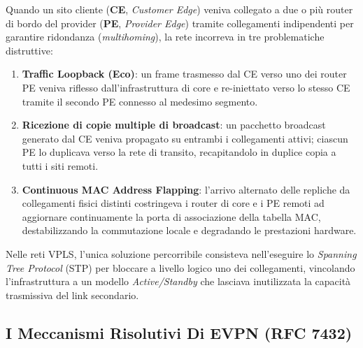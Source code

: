 \documentclass[11pt, a4paper]{article}
\begin{document}

Quando un sito cliente (\textbf{CE}, \emph{Customer Edge}) veniva collegato a due o più router di bordo del provider (\textbf{PE}, \emph{Provider Edge}) tramite collegamenti indipendenti per garantire ridondanza (\emph{multihoming}), la rete incorreva in tre problematiche distruttive:
\begin{enumerate}
    \item \textbf{Traffic Loopback (Eco)}: un frame trasmesso dal CE verso uno dei router PE veniva riflesso dall'infrastruttura di core e re-iniettato verso lo stesso CE tramite il secondo PE connesso al medesimo segmento.
    \item \textbf{Ricezione di copie multiple di broadcast}: un pacchetto broadcast generato dal CE veniva propagato su entrambi i collegamenti attivi; ciascun PE lo duplicava verso la rete di transito, recapitandolo in duplice copia a tutti i siti remoti.
    \item \textbf{Continuous MAC Address Flapping}: l'arrivo alternato delle repliche da collegamenti fisici distinti costringeva i router di core e i PE remoti ad aggiornare continuamente la porta di associazione della tabella MAC, destabilizzando la commutazione locale e degradando le prestazioni hardware.
\end{enumerate}

Nelle reti VPLS, l'unica soluzione percorribile consisteva nell'eseguire lo \emph{Spanning Tree Protocol} (STP) per bloccare a livello logico uno dei collegamenti, vincolando l'infrastruttura a un modello \emph{Active/Standby} che lasciava inutilizzata la capacità trasmissiva del link secondario.

\subsection{I Meccanismi Risolutivi Di EVPN (RFC 7432)}
\end{document}

